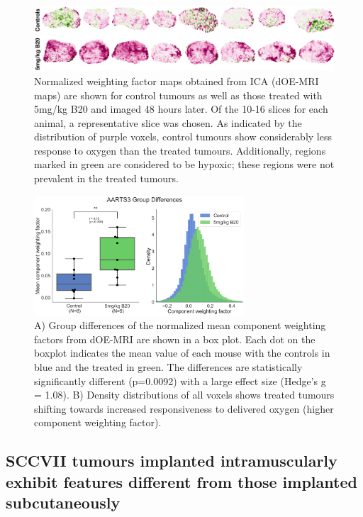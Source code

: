 \begin{figure}[htbp]
   \centering
   \includegraphics[width=\textwidth]{oemri_thesis3/oemri_thesis3-images/1_aarts3_b20_dOEMRI.png} %
   \caption{Normalized weighting factor maps obtained from \ac{ICA} (\ac{dOE-MRI} maps) are shown for control tumours as well as those treated with 5mg/kg B20 and imaged 48 hours later.
   Of the 10-16 slices for each animal, a representative slice was chosen.
   As indicated by the distribution of purple voxels, control tumours show considerably less response to oxygen than the treated tumours.
   Additionally, regions marked in green are considered to be hypoxic; these regions were not prevalent in the treated tumours.}
   \label{dOEMRImaps}
\end{figure}

\begin{figure}[htbp]
   \centering
   \includegraphics[width=0.7\textwidth]{oemri_thesis3/oemri_thesis3-images/2_aarts3_b20_boxplot_dOEMRI.png} %
   \caption{A) Group differences of the normalized mean component weighting factors from \ac{dOE-MRI} are shown in a box plot.
   Each dot on the boxplot indicates the mean value of each mouse with the controls in blue and the treated in green.
   The differences are statistically significantly different (p=0.0092) with a large effect size (Hedge's g = 1.08).
   B) Density distributions of all voxels shows treated tumours shifting towards increased responsiveness to delivered oxygen (higher component weighting factor).}
   \label{aarts3boxplot}
\end{figure}

\subsection{SCCVII tumours implanted intramuscularly exhibit features different from those implanted subcutaneously}

